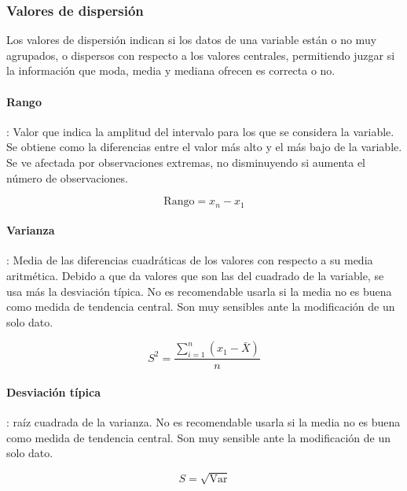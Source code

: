 \subsubsection{Valores de dispersión}
Los valores de dispersión indican si los datos de una variable están o no muy agrupados, o dispersos con respecto a los valores centrales, permitiendo juzgar si la información que moda, media y mediana ofrecen es correcta o no.
\paragraph{Rango}: Valor que indica la amplitud del intervalo para los que se considera la variable. Se obtiene como la diferencias entre el valor más alto y el más bajo de la variable. Se ve afectada por observaciones extremas, no disminuyendo si aumenta el número de observaciones.
\begin{center}
    \begin{equation}
        \mbox{Rango} = x_n - x_1
    \end{equation}
\end{center}
\paragraph{Varianza}: Media de las diferencias cuadráticas de los valores con respecto a su media aritmética. Debido a que da valores que son las del cuadrado de la variable, se usa más la desviación típica. No es recomendable usarla si la media no es buena como medida de tendencia central. Son muy sensibles ante la modificación de un solo dato.
\begin{center}
    \begin{equation}
        S^2 = \dfrac{\sum_{i = 1}^{n}\left(x_1-\bar{X}\right)}{n}
    \end{equation}
\end{center}
\paragraph{Desviación típica}: raíz cuadrada de la varianza. No es recomendable usarla si la media no es buena como medida de tendencia central. Son muy sensible ante la modificación de un solo dato.
\begin{center}
    \begin{equation}
        S = \sqrt{\mbox{Var}}
    \end{equation}
\end{center}
